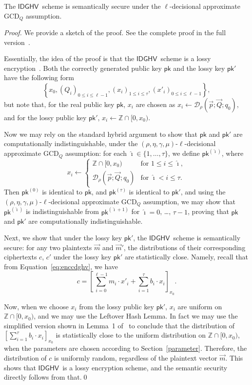 \documentclass{llncs}
\renewcommand\leq\leqslant
\newcommand{\Z}{{\mathbb Z}}
\newcommand*{\pk}{\ensuremath{\mathsf{pk}}}
\newcommand*{\CDGHV}{\ensuremath{\mathsf{IDGHV}}}
\newcommand*\D{\ensuremath{\mathcal D}}
\begin{document}
\begin{theorem}
The \CDGHV\ scheme is semantically secure under the $\ell$-decisional approximate $\mathrm{GCD}_Q$ assumption.
\end{theorem}
\begin{proof}
We provide a sketch of the proof.  See the complete proof in the full version~\cite{KLYC2013}.

Essentially, the idea of the proof is that the \CDGHV\ scheme is a lossy encryption~\cite{BHY2009}.  Both the correctly generated public key $\pk$ and the lossy key $\pk'$ have the following form
\[
\left\{ x_0, \left(Q_i\right)_{0\leq i \leq \ell-1},\left(x_i\right)_{1\leq i\leq \tau}, \left(x'_i\right)_{0\leq i\leq \ell-1}\right\},
\]
but note that, for the real public key $\pk$, $x_i$ are chosen as $x_i\gets\D_\rho(\vec{p}; \vec{Q}; q_0)$,
and for the lossy public key $\pk'$, $x_i\gets\Z\cap[0,x_0)$.

Now we may rely on the standard hybrid argument to show that $\pk$ and $\pk'$ are computationally indistinguishable, under the $(\rho,\eta,\gamma,\mu)$-$\ell$-decisional approximate GCD$_Q$ assumption: for each $\hat\imath\in\{1, \dots, \tau\}$, we define $\pk^{(\hat\imath)}$, where
\[
x_i \gets \begin{cases}
\Z\cap[0,x_0)&\text{for $1\leq i\leq \hat\imath$},\\
\D_\rho(\vec{p}; \vec{Q}; q_0)&\text{for $\hat\imath<i\leq\tau$}.
\end{cases}
\]
Then $\pk^{(0)}$ is identical to $\pk$, and $\pk^{(\tau)}$ is identical to $\pk'$, and using the $(\rho,\eta,\gamma,\mu)$-$\ell$-decisional approximate GCD$_Q$ assumption, we may show that $\pk^{(\hat\imath)}$ is indistinguishable from $\pk^{(\hat\imath+1)}$ for $\hat\imath=0$, \dots, $\tau-1$,
proving that $\pk$ and $\pk'$ are computationally indistinguishable.

Next, we show that under the lossy key $\pk'$, the \CDGHV\ scheme is semantically
secure: for any two plaintexts $\vec{m}$ and $\vec{m}'$,
the distributions of their corresponding ciphertexts $c$, $c'$ under
the lossy key $\pk'$ are statistically close.  Namely, recall that from
Equation~\eqref{eq:enccdghv}, we have
\begin{equation*}
c = \left[\sum\limits_{i=0}^{\ell-1} m_i \cdot x'_i + 
	\sum_{i=1}^\tau 
b_i\cdot x_i\right]_{x_0}.
\end{equation*}

Now, when we choose $x_i$ from the lossy public key $\pk'$, $x_i$ are
uniform on $\Z\cap[0,x_0)$, and we may use the Leftover Hash Lemma.
  In fact we may use the simplified version shown in Lemma~1
  of~\cite{vDGHV2010} to conclude that the distribution of
  $[\sum_{i=1}^\tau b_i\cdot x_i]_{x_0}$ is statistically close to the
  uniform distribution on $\Z\cap[0,x_0)$, when the parameters are
    chosen according to Section~\ref{parameter}.  Therefore, the
    distribution of $c$ is uniformly random, regardless of the plaintext
    vector $\vec{m}$.  This shows that \CDGHV\ is a lossy encryption
    scheme, and the semantic security directly follows from that.\qed 
\end{proof}
\end{document}
